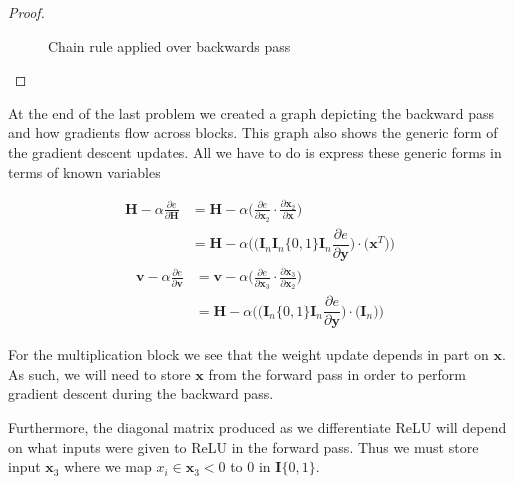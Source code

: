 \documentclass[11pt]{article}
\newcommand{\pd}{\partial}
\newcommand{\bs}{\boldsymbol}
\begin{document}
\begin{proof}
\begin{figure}[H]
	\caption{Chain rule applied over backwards pass}
	\end{figure}

\end{proof}



\begin{solution}
	At the end of the last problem we created a graph depicting the backward
	pass and how gradients flow across blocks. This graph also shows the
	generic form of the gradient descent updates. All we have to do is express
	these generic forms in terms of known variables

	\begin{align}
		\bs{H} - \alpha \frac{\pd e}{\pd \bs{H}}
		&= \bs{H} - \alpha \bigg(
			\frac{\pd e}{\pd \bs{x}_2}\cdot\frac{\pd\bs{x}_2}{\pd\bs{x}}
		\bigg)
		\\
		&= \bs{H} - \alpha \Bigg(
			\bigg(
				\bs{I}_n\bs{I}_n\{0, 1\}\bs{I}_n\dfrac{\pd e}{\pd\bs{y}}
			\bigg)
			\cdot
			\bigg(
				\bs{x}^T
			\bigg)
		\Bigg)
	\end{align}
	\begin{align}
		\bs{v} - \alpha \frac{\pd e}{\pd \bs{v}}
		&= \bs{v} - \alpha \bigg(
			\frac{\pd e}{\pd \bs{x}_3}\cdot\frac{\pd\bs{x}_3}{\pd\bs{x}_2}
		\bigg)
		\\
		&= \bs{H} - \alpha \Bigg(
			\bigg(
				\bs{I}_n\{0, 1\}\bs{I}_n\dfrac{\pd e}{\pd\bs{y}}
			\bigg)
			\cdot
			\bigg(
				\bs{I}_n
			\bigg)
		\Bigg)
	\end{align}

	For the multiplication block we see that the weight update depends in part on
	$\bs{x}$. As such, we will need to store $\bs{x}$ from the forward pass in
	order to perform gradient descent during the backward pass.

	Furthermore, the diagonal matrix produced as we differentiate ReLU will
	depend on what inputs were given to ReLU in the forward pass. Thus we must
	store input $\bs{x}_3$ where we map $x_i \in \bs{x}_3 < 0$ to $0$ in
	$\bs{I}\{0, 1\}$.

\end{solution}
\end{document}
